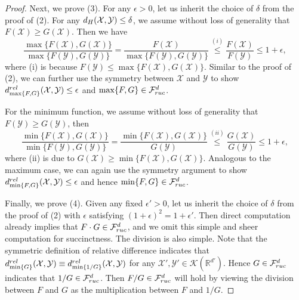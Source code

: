 \documentclass[10pt,a4paper]{amsart}
\newcommand{\RR}{\mathbb{R}}
\newcommand{\cF}{\mathcal{F}}
\newcommand{\cX}{\mathcal{X}}
\newcommand{\cY}{\mathcal{Y}}
\begin{document}
\begin{proof}
Next, we prove (3). For any $\epsilon>0$, let us inherit the choice of $\delta$ from the proof of (2). For any $d_{\rm H}(\cX,\cY)\leq\delta$, we assume without loss of generality that $F(\cX)\geq G(\cX)$. Then we have  
$$\frac{\max\{F(\cX),G(\cX)\}}{\max\{F(\cY),G(\cY)\}}=\frac{F(\cX)}{\max\{F(\cY),G(\cY)\}}\overset{(i)}{\leq}\frac{F(\cX)}{F(\cY)}\leq1+\epsilon,$$ where (i) is because $F(\cY)\leq\max\{F(\cX),G(\cX)\}$. Similar to the proof of (2), we can further use the symmetry between $\cX$ and $\cY$ to show $d_{\max\{F,G\}}^{\rm rel}(\cX,\cY)\leq\epsilon$ and $\max\{F,G\}\in\cF_{\rm ruc}^{d}$.

For the minimum function, we assume without loss of generality that $F(\cY)\geq G(\cY)$, then  
$$\frac{\min\{F(\cX),G(\cX)\}}{\min\{F(\cY),G(\cY)\}} = \frac{\min\{F(\cX),G(\cX)\}}{G(\cY)}\overset{(ii)}{\leq}\frac{G(\cX)}{G(\cY)}\leq 1+\epsilon,$$
where (ii) is due to $G(\cX)\geq\min\{F(\cX),G(\cX)\}$. Analogous to the maximum case, we can again use the symmetry argument to show $d_{\min\{F,G\}}^{\rm rel}(\cX,\cY)\leq\epsilon$ and hence $\min\{F,G\}\in\cF_{\rm ruc}^{d}$. 



Finally, we prove (4). Given any fixed $\epsilon'>0$, let us inherit the choice of $\delta$ from the proof of (2) with  $\epsilon$ satisfying 
$(1+\epsilon)^2 = 1+\epsilon'$. Then direct computation already implies that $F\cdot G\in\cF_{\rm ruc}^{d}$, and we omit this simple and sheer computation for succinctness. The division is also simple. Note that the symmetric definition of relative difference indicates that $d_{\min\{G\}}^{\rm rel}(\cX,\cY) \equiv d_{\min\{1/G\}}^{\rm rel}(\cX,\cY)$ for any $\cX',\cY'\in\mathcal{K}(\RR^{d'})$. Hence $G\in\cF_{\rm ruc}^{d}$ indicates that $1/G\in\cF_{\rm ruc}^{d}$. Then $F/G\in\cF_{\rm ruc}^{d}$ will hold by viewing the division between $F$ and $G$ as the multiplication between $F$ and $1/G$.
\end{proof}
\end{document}
